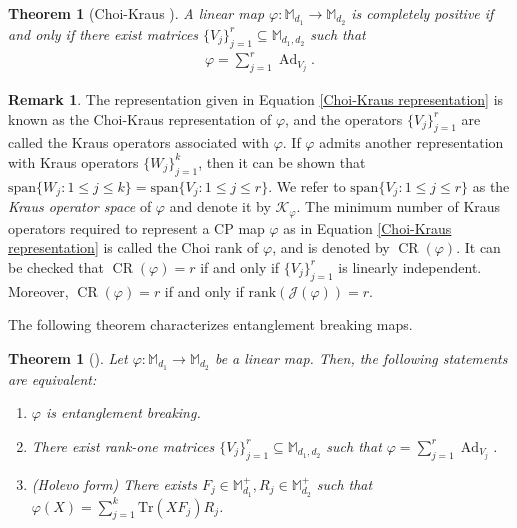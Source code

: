 \documentclass[11pt,reqno]{amsart}
\theoremstyle{definition}
\newtheorem{rmk}[defn]{Remark}
\theoremstyle{plain}
\newtheorem{thm}[defn]{Theorem}
\theoremstyle{remark}
\numberwithin{equation}{section}%
\begin{document}
 
 \begin{thm}[Choi-Kraus \cite{Cho75, Kra71}]
 	A linear map $\varphi:\mathbb{M}_{d_1}\rightarrow\mathbb{M}_{d_2}$ is completely positive if and only if there exist matrices $\{V_j\}_{j=1}^r\subseteq\mathbb{M}_{d_1,d_2}$ such that
 	\begin{align}\label{Choi-Kraus representation}
 		\varphi=\sum\limits_{j=1}^r \operatorname{Ad}_{V_j}.
 	\end{align}
 \end{thm}
 
 
 \begin{rmk}\label{metric operator space}
 	The representation given in Equation \ref{Choi-Kraus representation} is known as the Choi-Kraus representation of $\varphi$, and the operators $\{V_j\}_{j=1}^r$ are called the Kraus operators associated with $\varphi$. If $\varphi$ admits another representation with Kraus operators $\{W_j\}_{j=1}^k$, then it can be shown that $\text{span}\{W_j:1\leq j\leq k\}=\text{span}\{V_j:1\leq j\leq r\}$. We refer to $\text{span}\{V_j:1\leq j\leq r\}$ as the \textit{Kraus operator space} of $\varphi$ and denote it by $\mathscr{K}_\varphi$. The minimum number of Kraus operators required to represent a CP map $\varphi$ as in Equation \ref{Choi-Kraus representation} is called the Choi rank of $\varphi$, and is denoted by $\operatorname{CR}(\varphi)$. It can be checked that $\operatorname{CR}(\varphi)=r$ if and only if $\{V_j\}_{j=1}^r$ is linearly independent. Moreover, $\operatorname{CR}(\varphi)=r$ if and only if $\text{rank}(\mathcal{J}(\varphi))=r$.
  \end{rmk}
  
  
  The following theorem characterizes entanglement breaking maps.
  
  
  \begin{thm}[\cite{H, HSR}]\label{Holevo form}
  	Let $\varphi:\mathbb{M}_{d_1}\rightarrow\mathbb{M}_{d_2}$ be a linear map. Then, the following statements are equivalent:
  	\begin{enumerate}
  		\item $\varphi$ is entanglement breaking.
  		\item There exist rank-one matrices $\{V_j\}_{j=1}^r\subseteq\mathbb{M}_{d_1,d_2}$ such that $	\varphi=\sum_{j=1}^r \operatorname{Ad}_{V_j}$.
  		\item (Holevo form) There exists $F_j\in\mathbb{M}_{d_1}^+, R_j\in\mathbb{M}_{d_2}^+$ such that $\varphi(X)=\sum_{j=1}^k\text{Tr}(XF_j)R_j$.
  	\end{enumerate}
  \end{thm}
  
\end{document}
